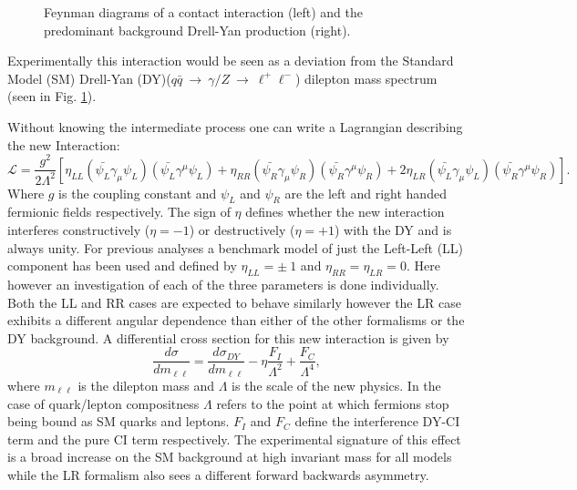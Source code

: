 \begin{figure}[h]
\begin{center}
\end{center}
\caption{Feynman diagrams of a contact interaction (left) and the predominant background Drell-Yan production (right).}
\label{fig:fd}
\end{figure}

Experimentally this interaction would be seen as a deviation from the Standard Model (SM) Drell-Yan (DY)($q\bar{q}~\rightarrow~\gamma/Z~\rightarrow~\ell^{+}\ell^{-}$) dilepton mass spectrum (seen in Fig. \ref{fig:fd}). 

Without knowing the intermediate process one can write a Lagrangian describing the new Interaction: 
\begin{equation}
        \mathcal{L} = \frac{g^{2}}{2\Lambda^{2}}
                [\eta_{LL} (\bar{\psi_{L}}\gamma_{\mu}\psi_{L}) (\bar{\psi_{L}}\gamma^{\mu}\psi_{L}) 
                + \eta_{RR} (\bar{\psi_{R}}\gamma_{\mu}\psi_{R}) (\bar{\psi_{R}}\gamma^{\mu}\psi_{R}) 
                + 2\eta_{LR} (\bar{\psi_{L}}\gamma_{\mu}\psi_{L}) (\bar{\psi_{R}}\gamma^{\mu}\psi_{R}) ].
\end{equation}
Where $g$ is the coupling constant and $\psi_{L}$ and $\psi_{R}$ are the left and right handed fermionic fields respectively.
The sign of $\eta$ defines whether the new interaction interferes constructively ($\eta = -1$) or destructively ($\eta = +1$) with the DY and is always unity. For previous analyses \cite{CDF, D0, ATLAS} a benchmark model of just the Left-Left (LL) component has been used and defined by $\eta_{LL} = \pm~1$ and $\eta_{RR} = \eta_{LR} = 0$. Here however an investigation of each of the three parameters is done individually. Both the LL and RR cases are expected to behave similarly however the LR case exhibits a different angular dependence than either of the other formalisms or the DY background.
A differential cross section for this new interaction is given by
\begin{equation}
        \frac{d\sigma}{dm_{\ell\ell}} = 
                \frac{d\sigma_{DY}}{dm_{\ell\ell}} 
                - \eta\frac{F_{I}}{\Lambda^{2}} 
                + \frac{F_{C}}{\Lambda^{4}},
\label{eq:DiffCross}
\end{equation}
where $m_{\ell\ell}$ is the dilepton mass and $\Lambda$ is the scale of the new physics. In the case of quark/lepton compositness $\Lambda$ refers to the point at which fermions stop being bound as SM quarks and leptons. $F_{I}$ and $F_{C}$ define the interference DY-CI term and the pure CI term respectively. The experimental signature of this effect is a broad increase on the SM background at high invariant mass for all models while the LR formalism also sees a different forward backwards asymmetry.

